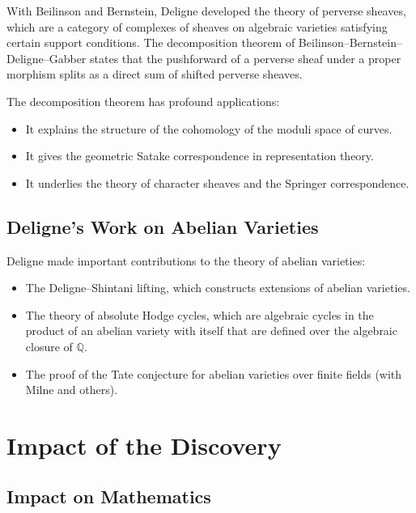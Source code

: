With Beilinson and Bernstein, Deligne developed the theory of perverse sheaves, which are a category of complexes of sheaves on algebraic varieties satisfying certain support conditions. The decomposition theorem of Beilinson--Bernstein--Deligne--Gabber states that the pushforward of a perverse sheaf under a proper morphism splits as a direct sum of shifted perverse sheaves.

The decomposition theorem has profound applications:
\begin{itemize}
\item It explains the structure of the cohomology of the moduli space of curves.
\item It gives the geometric Satake correspondence in representation theory.
\item It underlies the theory of character sheaves and the Springer correspondence.
\end{itemize}

\subsection{Deligne's Work on Abelian Varieties}

Deligne made important contributions to the theory of abelian varieties:
\begin{itemize}
\item The Deligne--Shintani lifting, which constructs extensions of abelian varieties.
\item The theory of absolute Hodge cycles, which are algebraic cycles in the product of an abelian variety with itself that are defined over the algebraic closure of $\mathbb{Q}$.
\item The proof of the Tate conjecture for abelian varieties over finite fields (with Milne and others).
\end{itemize}

\section{Impact of the Discovery}

\subsection{Impact on Mathematics}

